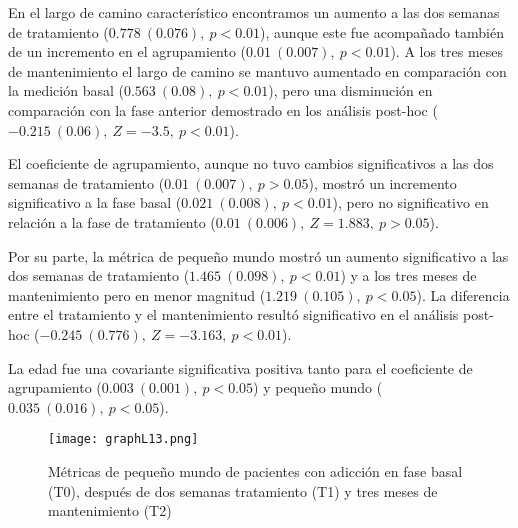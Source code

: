 En el largo de camino característico encontramos un aumento a las dos semanas de tratamiento ($0.778\ (0.076),\ p<0.01$), aunque este fue acompañado también de un incremento en el agrupamiento ($0.01\ (0.007),\ p<0.01$). A los tres meses de mantenimiento el largo de camino se mantuvo aumentado en comparación con la medición basal ($0.563\ (0.08),\ p<0.01$), pero una disminución en comparación con la fase anterior demostrado en los análisis post-hoc ($-0.215\ (0.06),\ Z=-3.5,\ p<0.01$). \par
El coeficiente de agrupamiento, aunque no tuvo cambios significativos a las dos semanas de tratamiento ($0.01\ (0.007),\ p>0.05$), mostró un incremento significativo a la fase basal ($0.021\ (0.008),\ p<0.01$), pero no significativo en relación a la fase de tratamiento ($0.01\ (0.006),\ Z=1.883,\ p>0.05$).\par
Por su parte, la métrica de pequeño mundo mostró un aumento significativo a las dos semanas de tratamiento ($1.465\ (0.098),\ p<0.01$) y a los tres meses de mantenimiento pero en menor magnitud ($1.219\ (0.105),\ p<0.05$). La diferencia entre el tratamiento y el mantenimiento resultó significativo en el análisis post-hoc ($-0.245\ (0.776),\ Z=-3.163,\ p<0.01$). \par
La edad fue una covariante significativa positiva tanto para el coeficiente de agrupamiento ($0.003\ (0.001),\ p<0.05$) y pequeño mundo ($0.035\ (0.016),\ p<0.05$).

\begin{figure}[!htb]
    \centering
    \texttt{[image: graphL13.png]}
    \caption{Métricas de pequeño mundo de pacientes con adicción en fase basal (T0), después de dos semanas tratamiento (T1) y tres meses de mantenimiento (T2)}
    \label{fig:gpL13}
\end{figure}


